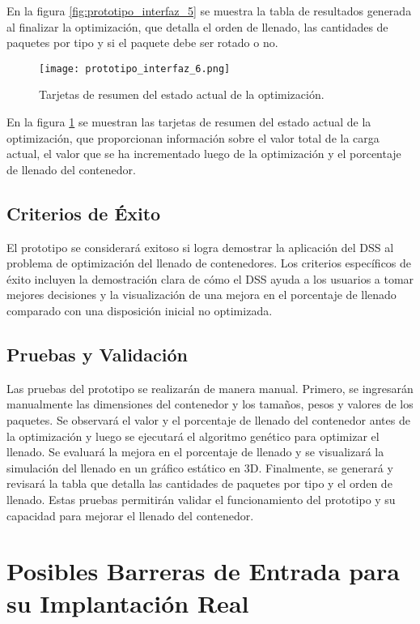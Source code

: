\documentclass[9pt,a4paper]{rho}
\begin{document}
En la figura \ref{fig:prototipo_interfaz_5} se muestra la tabla de resultados generada al finalizar la optimización, que detalla el orden de llenado, las cantidades de paquetes por tipo y si el paquete debe ser rotado o no.

\begin{figure}[h!]
    \centering
    \texttt{[image: prototipo\_interfaz\_6.png]}
    \caption{Tarjetas de resumen del estado actual de la optimización.}
    \label{fig:prototipo_interfaz_6}
\end{figure}

En la figura \ref{fig:prototipo_interfaz_6} se muestran las tarjetas de resumen del estado actual de la optimización, que proporcionan información sobre el valor total de la carga actual, el valor que se ha incrementado luego de la optimización y el porcentaje de llenado del contenedor.

\subsection{Criterios de Éxito}
El prototipo se considerará exitoso si logra demostrar la aplicación del DSS al problema de optimización del llenado de contenedores. Los criterios específicos de éxito \cite{newman2000success} incluyen la demostración clara de cómo el DSS ayuda a los usuarios a tomar mejores decisiones y la visualización de una mejora en el porcentaje de llenado comparado con una disposición inicial no optimizada.

\subsection{Pruebas y Validación}
Las pruebas del prototipo se realizarán de manera manual. Primero, se ingresarán manualmente las dimensiones del contenedor y los tamaños, pesos y valores de los paquetes. Se observará el valor y el porcentaje de llenado del contenedor antes de la optimización y luego se ejecutará el algoritmo genético para optimizar el llenado. Se evaluará la mejora en el porcentaje de llenado y se visualizará la simulación del llenado en un gráfico estático en 3D. Finalmente, se generará y revisará la tabla que detalla las cantidades de paquetes por tipo y el orden de llenado. Estas pruebas permitirán validar el funcionamiento del prototipo y su capacidad para mejorar el llenado del contenedor.

\section{Posibles Barreras de Entrada para su Implantación Real}
\end{document}
